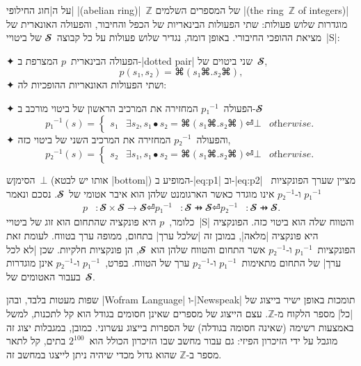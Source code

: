 על ה\ע|חוג החילופי| \E|(abelian ring)|~$ℤ$ של המספרים השלמים \E|(the ring~$ℤ$
of integers)| מוגדרות שלוש פעולות: שתי הפעולות הבינאריות של הכפל והחיבור,
והפעולה האונארית של מציאת ההופכי החיבורי. באופן דומה, נגדיר שלוש פעולות על כל
קבוצה~$𝓢$ של ביטויי~\E|S|:
\begin{enumerate}
  ✦ הפעולה הבינארית~$p$ המצרפת ב-\E|dotted pair| שני ביטוים של~$𝓢$,
  \begin{equation}
    p(s₁,s₂)=⌘(s₁⌘.s₂⌘),
  \end{equation}
  ✦ ושתי הפעולות האונאריות ההופכיות לה:
  \begin{enumerate}
    ✦ הפעולה~$p₁^{-1}$ המחזירה את המרכיב הראשון של ביטוי מורכב ב-$𝓢$
    \begin{equation}\label{eq:p1}
      p₁^{-1}(s)=\begin{cases}
        s₁ & ∃ s₂, s₁ ∙ s₂=⌘(s₁⌘.s₂⌘) ⏎
        ⊥  & \textit{otherwise}.
      \end{cases}
    \end{equation}
    ✦ והפעולה~$p₂^{-1}$ המחזירה את המרכיב השני של ביטוי כזה,
    \begin{equation}\label{eq:p2}
      p₂^{-1}(s)=\begin{cases}
        s₂ & ∃ s₁, s₁ ∙ s₂=⌘(s₁⌘.s₂⌘) ⏎
        ⊥  & \textit{otherwise}.
      \end{cases}
    \end{equation}
  \end{enumerate}
\end{enumerate}
הסימןש~$⊥$ (אותו יש לבטא \E|bottom|) המופיע ב-|eq:p1| וב-|eq:p2|
מציין שערך הפונקציות~$p₁^{-1}$ ו-$p₂^{-1}$ אינו מוגדר כאשר הארגומנט שלהן הוא
איבר אטומי של~$𝓢$. נסכם ונאמר
\begin{equation}
  \begin{split}
    p&:𝓢×𝓢→𝓢⏎
    p₁^{-1}&:𝓢 ⇸𝓢⏎
    p₂^{-1}&:𝓢 ⇸𝓢.
  \end{split}
\end{equation}
כלומר,~$p$ היא פונקציה שהתחום הוא זוג של ביטויי~\E|S| והטווח שלה הוא ביטוי כזה.
הפונקציה היא פונקציה \ע|מלאה|, במובן זה \ע|שלכל ערך| בתחום, ממופה ערך בטווח.
לעומת זאת הפונקציות~$p₁^{-1}$ ו-$p₂^{-1}$ אשר התחום והטווח שלהן הוא~$𝓢$, הן
פונקציות חלקיות. שכן \ע|לא לכל ערך| של התחום מתאימות~$p₁^{-1}$ ו-$p₂^{-1}$ ערך
של הטווח. בפרט,~$p₁^{-1}$ ו-$p₂^{-1}$ אינן מוגדרות בעבור האטומים של~$𝓢$.

שפות מעטות בלבד, ובהן \E|Wofram Language| ו-\E|Newspeak| תומכות באופן ישיר
בייצוג של \ע|כל| מספר הלקוח מ-$ℤ$. עצם הייצוג של מספרים שאינן חסומים בגודל
הוא קל לתכנות, למשל באמצעות רשימה (שאינה חסומה בגודלה) של הספרות בייצוג עשרוני.
כמובן, במגבלות יצוג זה מוגבל על ידי הזיכרון הפיזי: גם עבור מחשב שבו הזיכרון
הכולל הוא~$2^{100}$ בתים, קל לתאר מספר ב-$ℤ$ שהוא גדול מכדי שיהיה ניתן לייצגו
במחשב זה.

